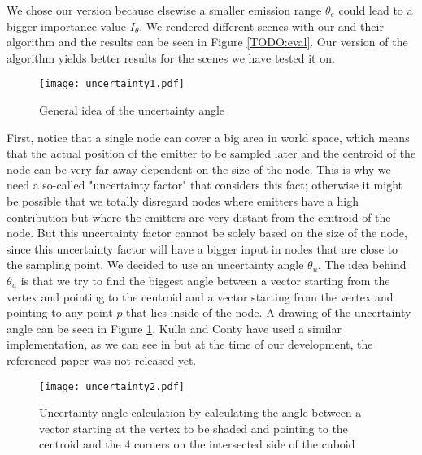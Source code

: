 We chose our version because elsewise a smaller emission range $\theta_e$ could lead to a bigger importance value $I_\theta$. We rendered different scenes with our and their algorithm and the results can be seen in Figure \ref{TODO:eval}. Our version of the algorithm yields better results for the scenes we have tested it on.

\begin{figure}
	\begin{center}
		\texttt{[image: uncertainty1.pdf]}
		\caption{General idea of the uncertainty angle}
		\label{fig:uncertainty1}
	\end{center}
\end{figure}

First, notice that a single node can cover a big area in world space, which means that the actual position of the emitter to be sampled later and the centroid of the node can be very far away dependent on the size of the node. This is why we need a so-called "uncertainty factor" that considers this fact; otherwise it might be possible that we totally disregard nodes where emitters have a high contribution but where the emitters are very distant from the centroid of the node. But this uncertainty factor cannot be solely based on the size of the node, since this uncertainty factor will have a bigger input in nodes that are close to the sampling point. We decided to use an uncertainty angle $\theta_u$. The idea behind $\theta_u$ is that we try to find the biggest angle between a vector starting from the vertex and pointing to the centroid and a vector starting from the vertex and pointing to any point $p$ that lies inside of the node. A drawing of the uncertainty angle can be seen in Figure \ref{fig:uncertainty1}. Kulla and Conty have used a similar implementation, as we can see in \cite{MLP} but at the time of our development, the referenced paper was not released yet.

\begin{figure}
	\begin{center}
		\texttt{[image: uncertainty2.pdf]}
		\caption{Uncertainty angle calculation by calculating the angle between a vector starting at the vertex to be shaded and pointing to the centroid and the 4 corners on the intersected side of the cuboid}
		\label{fig:uncertainty2}
	\end{center}
\end{figure}

